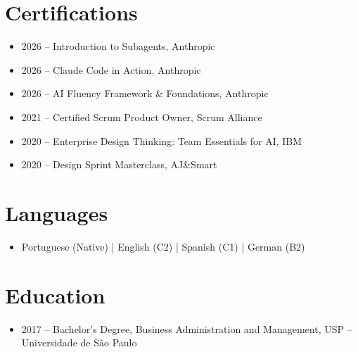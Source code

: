 \documentclass[11pt,a4paper]{article}
\begin{document}
\vspace{6pt}

\section*{Certifications}
\begin{itemize}[leftmargin=*, label=$\bullet$, itemsep=2pt, parsep=0pt]
\item 2026 -- Introduction to Subagents, Anthropic
\item 2026 -- Claude Code in Action, Anthropic
\item 2026 -- AI Fluency Framework \& Foundations, Anthropic
\item 2021 -- Certified Scrum Product Owner\textregistered{}, Scrum Alliance
\item 2020 – Enterprise Design Thinking: Team Essentials for AI, IBM
\item 2020 – Design Sprint Masterclass, AJ\&Smart
\end{itemize}

\vspace{8pt}

\section*{Languages}
\begin{itemize}[leftmargin=*, label=$\bullet$, itemsep=2pt, parsep=0pt]
\item Portuguese (Native) \quad | \quad English (C2) \quad | \quad Spanish (C1) \quad | \quad German (B2)
\end{itemize}

\vspace{8pt}

\section*{Education}
\begin{itemize}[leftmargin=*, label=$\bullet$, itemsep=2pt, parsep=0pt]
\item 2017 – Bachelor's Degree, Business Administration and Management, USP – Universidade de São Paulo
\end{itemize}
\end{document}
